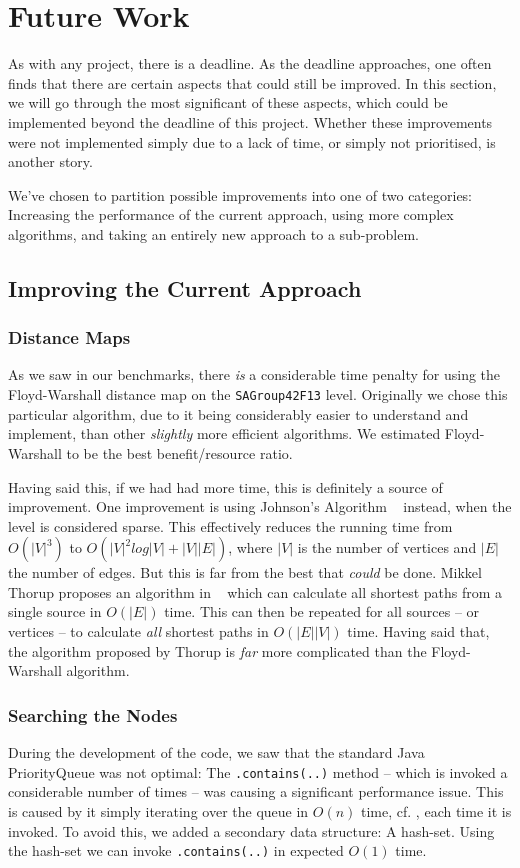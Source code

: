 \documentclass[letterpaper]{article}
\begin{document}
\section{Future Work}
	As with any project, there is a deadline. As the deadline approaches, one often finds that there are certain aspects that could still be improved. In this section, we will go through the most significant of these aspects, which could be implemented beyond the deadline of this project. Whether these improvements were not implemented simply due to a lack of time, or simply not prioritised, is another story. 

	We've chosen to partition possible improvements into one of two categories: Increasing the performance of the current approach, using more complex algorithms, and taking an entirely new approach to a sub-problem.
	
	\subsection{Improving the Current Approach} 

		\subsubsection{Distance Maps}
			As we saw in our benchmarks, there \emph{is} a considerable time penalty for using the Floyd-Warshall distance map on the \verb=SAGroup42F13= level. Originally we chose this particular algorithm, due to it being considerably easier to understand and implement, than other \emph{slightly} more efficient algorithms. We estimated Floyd-Warshall to be the best benefit/resource ratio.

			Having said this, if we had had more time, this is definitely a source of improvement. One improvement is using Johnson's Algorithm ~\cite{jonhson} instead, when the level is considered sparse. This effectively reduces the running time from $O(|V|^3)$ to $O(|V|^2log|V|+|V||E|)$, where $|V|$ is the number of vertices and $|E|$ the number of edges. But this is far from the best that \emph{could} be done. Mikkel Thorup proposes an algorithm in ~\cite{thorup} which can calculate all shortest paths from a single source in $O(|E|)$ time. This can then be repeated for all sources -- or vertices -- to calculate \emph{all} shortest paths in $O(|E||V|)$ time. Having said that, the algorithm proposed by Thorup is \emph{far} more complicated than the Floyd-Warshall algorithm.


		\subsubsection{Searching the Nodes}
			During the development of the code, we saw that the standard Java PriorityQueue was not optimal: The \verb=.contains(..)= method -- which is invoked a considerable number of times -- was causing a significant performance issue. This is caused by it simply iterating over the queue in $O(n)$ time, cf. \cite{website:Java-Docs}, each time it is invoked. To avoid this, we added a secondary data structure: A hash-set. Using the hash-set we can invoke \verb=.contains(..)= in expected $O(1)$ time.
\end{document}
